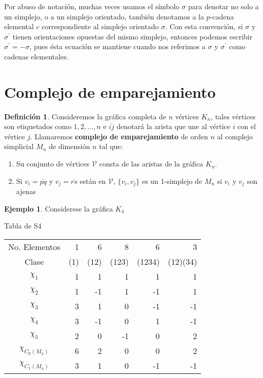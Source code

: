 \documentclass[12pt]{book}
\theoremstyle{definition}
\newtheorem{definition}[theorem]{Definición}
\newtheorem{example}[theorem]{Ejemplo}
\newcounter{in}
\newcounter{ini}
\begin{document}
{Por abuso de notación, muchas veces usamos el símbolo $\sigma$ para
denotar no solo a un simplejo, o a un simplejo orientado, también
denotamos a la $p$-cadena elemental $c$ correspondiente al simplejo
orientado $\sigma$. Con esta convención, si $\sigma$ y $\sigma^{'}$
tienen orientaciones opuestas del mismo simplejo, entonces podemos
escribir $\sigma^{'}=-\sigma$, pues ésta ecuación se mantiene cuando
nos referimos a $\sigma$ y $\sigma^{'}$ como cadenas elementales.



\section{Complejo de emparejamiento}

\begin{definition}
Consideremos la gráfica completa de $n$ vértices $K_{n}$, tales
vértices son etiquetados como $1,2,\ldots,n$ e
$\overline{ij}$ denotará la arista que une al vértice $i$ con el
vértice $j$. Llamaremos \textbf{complejo de emparejamiento} de orden
$n$ al complejo simplicial $M_{n}$ de dimensión $n$ tal que:

\begin{enumerate}
  \item Su conjunto de vértices $\mathcal{V}$ consta de las aristas de la gráfica
  $K_{n}$. 
  \item Si $v_{i}=\overline{pq}$ y $v_{j}=\overline{rs}$ están en
  $\mathcal{V}$, $\{v_{i},v_{j}\}$ es  un 1-simplejo de $M_{n}$ si $v_{i}$
  y $v_{j}$ son ajenas
\end{enumerate} 
\end{definition}

\begin{example}
Considerese la gráfica $K_{4}$
\end{example}


\bigskip
\bigskip
\bigskip
\bigskip
\bigskip
\bigskip
\bigskip
\bigskip
\bigskip
\bigskip

\begin{center}
Tabla de S4

\begin{tabular}{c|r r r r r}
  No. Elementos& 1 & 6 & 8 & 6 & 3 \\
  Clase & (1) & (12) & (123) & (1234) &(12)(34)\\
    \hline
  $\chi_{{1}}$ & 1 & 1 & 1 & 1 & 1 \\
  $\chi_{{2}}$ & 1 & -1 & 1 & -1 & 1\\
  $\chi_{{3}}$ & 3 & 1 & 0 & -1 & -1\\
  $\chi_{{4}}$ & 3 & -1 & 0 & 1 & -1 \\
  $\chi_{{5}}$ & 2 & 0 & -1 & 0 & 2 \\
    \hline
  $\chi_{C_{0}(M_{4})}$ & 6 & 2 & 0 & 0 & 2 \\
  $\chi_{C_{1}(M_{4})}$ & 3 & 1 & 0 & -1 & -1
\end{tabular}
\end{center}

}
\end{document}
